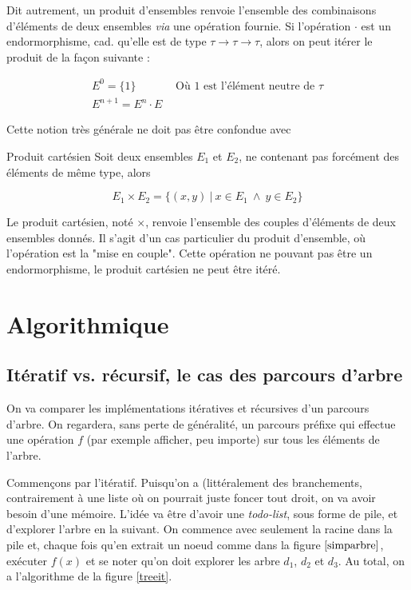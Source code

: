 Dit autrement, un produit d'ensembles renvoie l'ensemble des combinaisons d'éléments de deux ensembles \textit{via} une opération fournie. Si l'opération $\cdot$ est un endormorphisme, cad. qu'elle est de type $\tau \rightarrow \tau \rightarrow \tau$, alors on peut itérer le produit de la façon suivante :

\begin{eqnarray*}
E^0 = \{1\} ~~~~~~~~~~~~~~~~ \textrm{Où $1$ est l'élément neutre de $\tau$} \\
E^{n+1} = E^n \cdot E
\end{eqnarray*}

Cette notion très générale ne doit pas être confondue avec

\begin{definition}{Produit cartésien}{}
Soit deux ensembles $E_1$ et $E_2$, ne contenant pas forcément des éléments de même type, alors

\[
E_1 \times E_2 = \{(x,y)~|~x \in E_1~\wedge~y \in E_2\}
\]
\end{definition}

Le produit cartésien, noté $\times$, renvoie l'ensemble des couples d'éléments de deux ensembles donnés. Il s'agit d'un cas particulier du produit d'ensemble, où l'opération est la "mise en couple". Cette opération ne pouvant pas être un endormorphisme, le produit cartésien ne peut être itéré.

\section{Algorithmique}

\subsection{Itératif vs. récursif, le cas des parcours d'arbre}

On va comparer les implémentations itératives et récursives d'un parcours d'arbre. On regardera, sans perte de généralité, un parcours préfixe qui effectue une opération $f$ (par exemple afficher, peu importe) sur tous les éléments de l'arbre.

Commençons par l'itératif. Puisqu'on a (littéralement des branchements, contrairement à une liste où on pourrait juste foncer tout droit, on va avoir besoin d'une mémoire. L'idée va être d'avoir une \textit{todo-list}, sous forme de pile, et d'explorer l'arbre en la suivant. On commence avec seulement la racine dans la pile et, chaque fois qu'en extrait un noeud comme dans la figure $\ref{simparbre}$, exécuter $f(x)$ et se noter qu'on doit explorer les arbre $d_1$, $d_2$ et $d_3$. Au total, on a l'algorithme de la figure \ref{treeit}.

